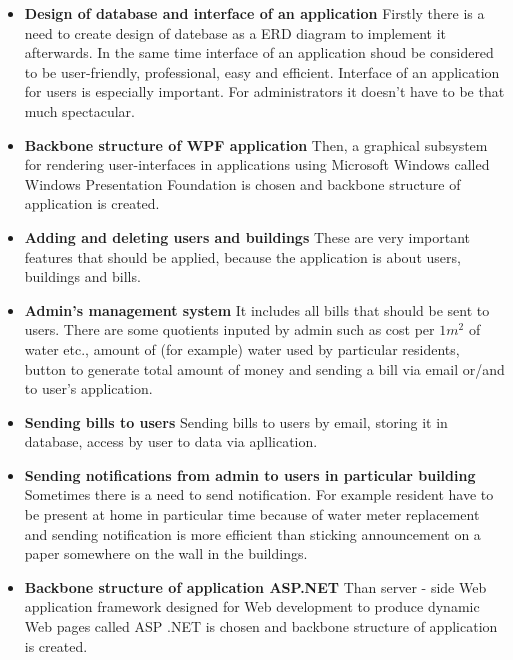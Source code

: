 \documentclass[a4paper,11pt,onecolumn,oneside]{book}
\begin{document}
\begin{itemize}
  \item \textbf{Design of database and interface of an application} 
  \newline Firstly there is a need to create design of datebase as a ERD diagram to implement it afterwards. In the same time interface of an application shoud be considered to be user-friendly, professional, easy and efficient. Interface of an application for users is especially important. For administrators it doesn't have to be that much spectacular. 

  \item \textbf{Backbone structure of WPF application} 
    \newline
     Then, a graphical subsystem for rendering user-interfaces in applications using Microsoft Windows called Windows Presentation Foundation is chosen and backbone structure of application is created. 

  \item \textbf{Adding and deleting users and buildings} 
    \newline These are very important features that should be applied, because the application is about users, buildings and bills. 

  \item \textbf{Admin's management system} 
    \newline It includes all bills that should be sent to users. There are some quotients inputed by admin such as cost per \(1m^2\) of water etc., amount of (for example) water used by particular residents, button to generate total amount of money and sending a bill via email or/and to user's application.

  \item \textbf{Sending bills to users} 
    \newline Sending bills to users by email, storing it in database, access by user to data via apllication.
  
  \item \textbf{Sending notifications from admin to users in particular building} 
    \newline Sometimes there is a need to send notification. For example resident have to be present at home in particular time because of water meter replacement and sending notification is more efficient than sticking announcement on a paper somewhere on the wall in the buildings. 
  
  \item \textbf{Backbone structure of application ASP.NET} 
    \newline Than server - side Web application framework designed for Web development to produce dynamic Web pages called ASP .NET is chosen and backbone structure of application is created.
  

\end{itemize}
\end{document}
